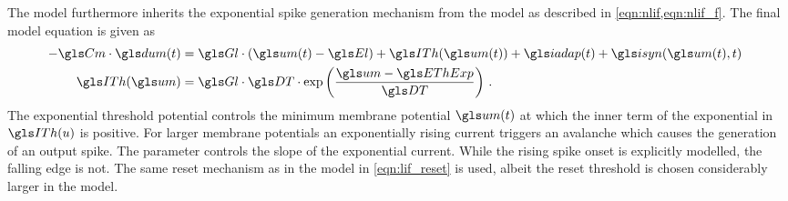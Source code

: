 The model furthermore inherits the exponential spike generation mechanism from the \EIF model as described in \cref{eqn:nlif,eqn:nlif_f}. The final model equation is given as
\begin{align}
	\hspace{-0.2cm}-\Cm \cdot \dum(t) &= \Gl \cdot (\um(t) - \El) + \ITh(\um(t)) + \iadap(t) + \isyn(\um(t), t) \label{eqn:adex} \\
	\ITh(\um) &= \Gl \cdot \DT \cdot \exp \left(\frac{\um - \EThExp}{\DT}\right) \,.
	\label{eqn:adex_ith}
\end{align}
The exponential threshold potential \EThExp controls the minimum membrane potential $\um(t)$ at which the inner term of the exponential in $\ITh(u)$ is positive. For larger membrane potentials an exponentially rising current triggers an avalanche which causes the generation of an output spike. The parameter \DT controls the slope of the exponential current. While the rising spike onset is explicitly modelled, the falling edge is not. The same reset mechanism as in the \LIF model in \cref{eqn:lif_reset} is used, albeit the reset threshold \ETh is chosen considerably larger in the \AdEx model.


